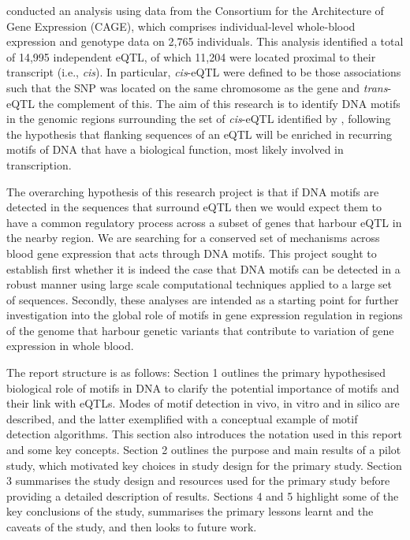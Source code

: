 \documentclass[12pt]{article}
\begin{document}
\citet{lloyd2017genetic} conducted an analysis using data from the Consortium for the Architecture of Gene Expression (CAGE), which comprises individual-level whole-blood expression and genotype data on 2,765 individuals. This analysis identified a total of 14,995 independent eQTL, of which 11,204  were located proximal to their transcript (i.e., \emph{cis}). In particular, \emph{cis}-eQTL were defined to be those associations such that the SNP was located on the same chromosome as the gene and \emph{trans}-eQTL the complement of this. The aim of this research is to identify DNA motifs in the genomic regions surrounding the set of \emph{cis}-eQTL identified by \citet{lloyd2017genetic}, following the hypothesis that flanking sequences of an eQTL will be enriched in recurring motifs of DNA that have a biological function, most likely involved in transcription.

The overarching hypothesis of this research project is that if DNA motifs are detected in the sequences that surround eQTL then we would expect them to have a common regulatory process across a subset of genes that harbour eQTL in the nearby region. We are searching for a conserved set of mechanisms across blood gene expression that acts through DNA motifs. This project sought to establish first whether it is indeed the case that DNA motifs can be detected in a robust manner using large scale computational techniques applied to a large set of sequences. Secondly, these analyses are intended as a starting point for further investigation into the global role of motifs in  gene expression regulation in regions of the genome that harbour genetic variants that contribute to variation of gene expression in whole blood. 

The report structure is as follows: Section 1 outlines the 
primary hypothesised biological role of motifs in DNA to clarify the potential importance of motifs and their link with eQTLs. Modes of motif detection in vivo, in vitro and in silico are described, and the latter exemplified with a conceptual example of motif detection algorithms. This section also introduces the notation used in this report and some key concepts. Section 2 outlines the purpose and main results of a pilot study, which motivated key choices in study design for the primary study.  Section 3 summarises the study design and resources used for the primary study before providing a detailed description of results. Sections 4 and 5 highlight some of the key conclusions of the study, summarises the primary lessons learnt and the caveats of the study, and then looks to future work. 
 
\end{document}
